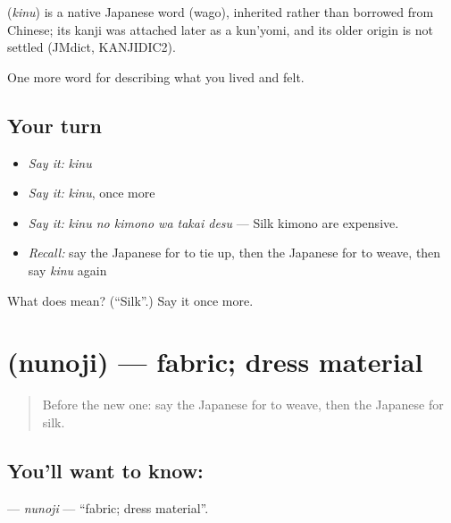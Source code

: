 \begin{cousinweb}
\textbf{} (\emph{kinu}) is a native Japanese word (wago), inherited rather than borrowed from Chinese; its kanji was attached later as a kun'yomi, and its older origin is not settled (JMdict, KANJIDIC2).
\end{cousinweb}

\begin{grammarlens}[title={What you've built}]
One more word for describing what you lived and felt.
\end{grammarlens}

\subsection*{Your turn}
\begin{itemize}
\raggedright
  \item \emph{Say it:} \emph{kinu}
  \item \emph{Say it:} \emph{kinu}, once more
  \item \emph{Say it:} \emph{kinu no kimono wa takai desu} — Silk kimono are expensive.
  \item \emph{Recall:} say the Japanese for to tie up, then the Japanese for to weave, then say \emph{kinu} again
\end{itemize}

\begin{tcolorbox}[breakable,colback=teal!4,colframe=teal!35!black,title={Before you move on}]
What does  mean? (\textquotedblleft{}Silk\textquotedblright{}.) Say it once more.
\end{tcolorbox}
\section[\texorpdfstring{\ja{ぬのじ} (nunoji)}{ぬのじ (nunoji)}]{ (nunoji) — fabric; dress material}

\label{lesson:JA-C485-nunoji}



\begin{quote}
Before the new one: say the Japanese for to weave, then the Japanese for silk.
\end{quote}

\subsection*{You'll want to know: }
\textbf{} — \emph{nunoji} — \textquotedblleft{}fabric; dress material\textquotedblright{}.


